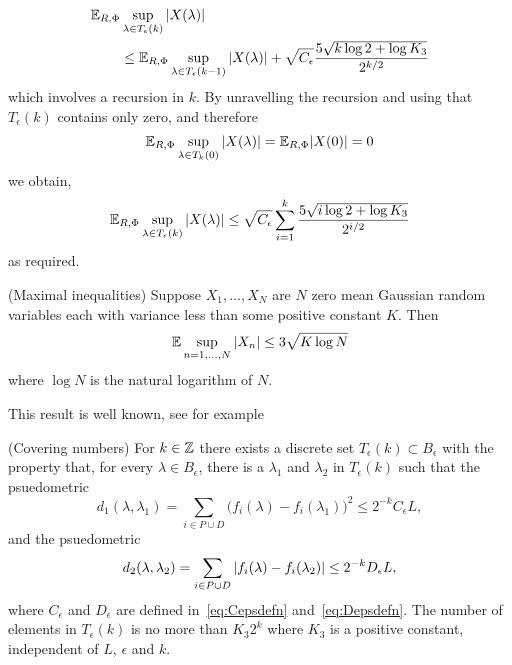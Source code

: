 \documentclass[journal]{IEEEtran}
\begin{document}
\begin{IEEEproof}
\begin{align*}
{\mathbb E}_{R,\Phi}&\sup_{\lambda \in T_\epsilon(k)}{\vert X(\lambda) \vert} \\
&\leq {\mathbb E}_{R,\Phi}\sup_{\lambda \in T_\epsilon(k-1)}{\vert X(\lambda) \vert} + \sqrt{C_\epsilon} \frac{5\sqrt{k \log 2 + \log K_3}}{2^{k/2}}  
\end{align*}
which involves a recursion in $k$.  By unravelling the recursion and using that $T_\epsilon(k)$ contains only zero, and therefore
\[
{\mathbb E}_{R,\Phi} \sup_{\lambda \in T_k(0)} {\vert X(\lambda) \vert} = {\mathbb E}_{R,\Phi} {\vert X(0) \vert} = 0
\]
we obtain,
\[
{\mathbb E}_{R,\Phi}\sup_{\lambda \in T_\epsilon(k)}{\vert X(\lambda) \vert} \leq  \sqrt{C_\epsilon} \sum_{i=1}^k \frac{5\sqrt{i \log 2 + \log K_3}}{2^{i/2}}  
\]
as required.
\end{IEEEproof}

\begin{lemma}\label{lem:maxineq}(Maximal inequalities)
Suppose $X_1, \dots, X_N$ are $N$ zero mean Gaussian random variables each with variance less than some positive constant $K$.  Then
\[
{\mathbb E} \sup_{n = 1, \dots, N} {\left\vert X_n \right\vert} \leq 3  \sqrt{K \log N}
\]
where $\log N$ is the natural logarithm of $N$.
\end{lemma}
\begin{IEEEproof}
This result is well known, see for example~\cite[Section 3]{Pollard_asymp_empi_proc_1989}  
\end{IEEEproof}


\begin{lemma}\label{lem:metricentropy}(Covering numbers)
For $k \in {\mathbb Z}$ there exists a discrete set $T_\epsilon(k) \subset B_\epsilon$ with the property that, for every $\lambda \in B_\epsilon$, there is a $\lambda_1$ and $\lambda_2$ in $T_\epsilon(k)$ such that the psuedometric
\[
d_1(\lambda, \lambda_1) = \sum_{i \in P \cup D} \big( f_{i}(\lambda) - f_{i}(\lambda_1) \big)^2 \leq 2^{-k} C_\epsilon L,
\]
and the psuedometric
\[
d_2(\lambda, \lambda_2) = \sum_{i \in P \cup D} {\vert f_{i}(\lambda) - f_{i}(\lambda_2) \vert} \leq 2^{-k} D_\epsilon L,
\]
where $C_\epsilon$ and $D_\epsilon$ are defined in~\eqref{eq:Cepsdefn} and~\eqref{eq:Depsdefn}.  The number of elements in $T_\epsilon(k)$ is no more than $K_3 2^{k}$ where $K_3$ is a positive constant, independent of $L$, $\epsilon$ and $k$.
\end{lemma}
\begin{IEEEproof}

\end{IEEEproof}
\end{document}

